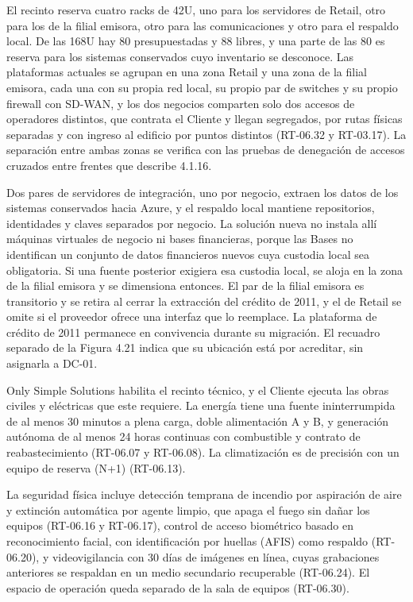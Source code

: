 \documentclass[11pt]{article}
\begin{document}
El recinto reserva cuatro racks de 42U, uno para los servidores de Retail, otro para los de la filial emisora, otro para las comunicaciones y otro para el respaldo local. De las 168U hay 80 presupuestadas y 88 libres, y una parte de las 80 es reserva para los sistemas conservados cuyo inventario se desconoce. Las plataformas actuales se agrupan en una zona Retail y una zona de la filial emisora, cada una con su propia red local, su propio par de switches y su propio firewall con SD-WAN, y los dos negocios comparten solo dos accesos de operadores distintos, que contrata el Cliente y llegan segregados, por rutas físicas separadas y con ingreso al edificio por puntos distintos (RT-06.32 y RT-03.17). La separación entre ambas zonas se verifica con las pruebas de denegación de accesos cruzados entre frentes que describe 4.1.16.

Dos pares de servidores de integración, uno por negocio, extraen los datos de los sistemas conservados hacia Azure, y el respaldo local mantiene repositorios, identidades y claves separados por negocio. La solución nueva no instala allí máquinas virtuales de negocio ni bases financieras, porque las Bases no identifican un conjunto de datos financieros nuevos cuya custodia local sea obligatoria. Si una fuente posterior exigiera esa custodia local, se aloja en la zona de la filial emisora y se dimensiona entonces. El par de la filial emisora es transitorio y se retira al cerrar la extracción del crédito de 2011, y el de Retail se omite si el proveedor ofrece una interfaz que lo reemplace. La plataforma de crédito de 2011 permanece en convivencia durante su migración. El recuadro separado de la Figura 4.21 indica que su ubicación está por acreditar, sin asignarla a DC-01.

Only Simple Solutions habilita el recinto técnico, y el Cliente ejecuta las obras civiles y eléctricas que este requiere. La energía tiene una fuente ininterrumpida de al menos 30 minutos a plena carga, doble alimentación A y B, y generación autónoma de al menos 24 horas continuas con combustible y contrato de reabastecimiento (RT-06.07 y RT-06.08). La climatización es de precisión con un equipo de reserva (N+1) (RT-06.13).

La seguridad física incluye detección temprana de incendio por aspiración de aire y extinción automática por agente limpio, que apaga el fuego sin dañar los equipos (RT-06.16 y RT-06.17), control de acceso biométrico basado en reconocimiento facial, con identificación por huellas (AFIS) como respaldo (RT-06.20), y videovigilancia con 30 días de imágenes en línea, cuyas grabaciones anteriores se respaldan en un medio secundario recuperable (RT-06.24). El espacio de operación queda separado de la sala de equipos (RT-06.30).
\end{document}
